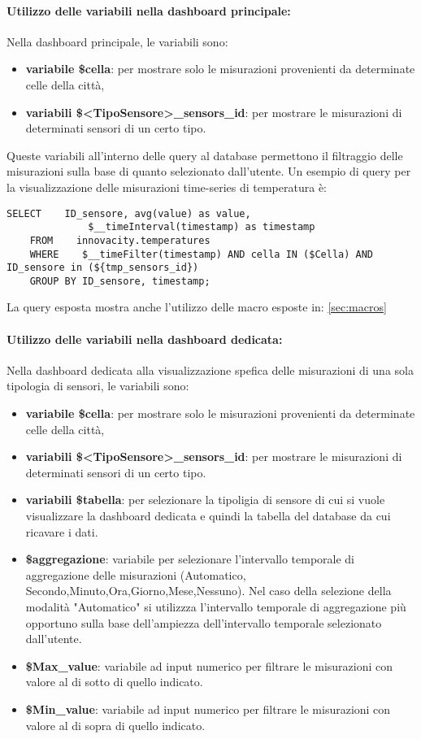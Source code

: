 \paragraph*{Utilizzo delle variabili nella dashboard principale:}
Nella dashboard principale, le variabili sono:
\begin{itemize}
    \item \textbf{variabile \$cella}: per mostrare solo le misurazioni provenienti da determinate celle della città, 
    \item \textbf{variabili \$<TipoSensore>\_sensors\_id}: per mostrare le misurazioni di determinati sensori di un certo tipo.
\end{itemize}
Queste variabili all'interno delle query al database permettono il filtraggio delle misurazioni sulla base di quanto selezionato dall'utente.
Un esempio di query per la visualizzazione delle misurazioni time-series di temperatura è:
\begin{lstlisting}[style=code]
    SELECT    ID_sensore, avg(value) as value,
              $__timeInterval(timestamp) as timestamp
    FROM    innovacity.temperatures 
    WHERE    $__timeFilter(timestamp) AND cella IN ($Cella) AND ID_sensore in (${tmp_sensors_id})
    GROUP BY ID_sensore, timestamp;
\end{lstlisting}

La query esposta mostra anche l'utilizzo delle macro esposte in: \ref{sec:macros}
\paragraph*{Utilizzo delle variabili nella dashboard dedicata:}
Nella dashboard dedicata alla visualizzazione spefica delle misurazioni di una sola tipologia di sensori, le variabili sono:
\begin{itemize}
    \item \textbf{variabile \$cella}: per mostrare solo le misurazioni provenienti da determinate celle della città, 
    \item \textbf{variabili \$<TipoSensore>\_sensors\_id}: per mostrare le misurazioni di determinati sensori di un certo tipo.
    \item \textbf{variabili \$tabella}: per selezionare la tipoligia di sensore di cui si vuole visualizzare la dashboard dedicata e quindi la tabella del database da cui ricavare i dati.
    \item \textbf{\$aggregazione}: variabile per selezionare l'intervallo temporale di aggregazione delle misurazioni
    (Automatico, Secondo,Minuto,Ora,Giorno,Mese,Nessuno).
    Nel caso della selezione della modalità "Automatico" si utilizzza l'intervallo temporale di aggregazione più opportuno sulla base dell'ampiezza dell'intervallo temporale selezionato dall'utente.
    \item \textbf{\$Max\_value}: variabile ad input numerico per filtrare le misurazioni con valore al di sotto di quello indicato.
    \item \textbf{\$Min\_value}: variabile ad input numerico per filtrare le misurazioni con valore al di sopra di quello indicato.
\end{itemize}

